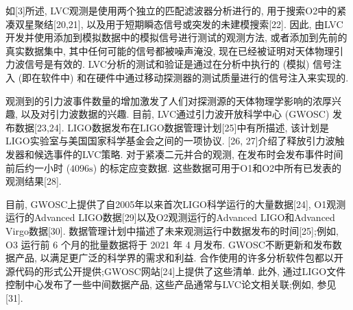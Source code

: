 \documentclass[a4paper]{\documentclassname}
\def\t{\text}
\theoremstyle{definition}
\begin{document}
如[3]所述, LVC观测是使用两个独立的匹配滤波器分析进行的, 用于搜索O2中的紧凑双星聚结[20,21], 以及用于短期瞬态信号或突发的未建模搜索[22]. 因此, 由LVC开发并使用添加到模拟数据中的模拟信号进行测试的观测方法, 或者添加到先前的真实数据集中, 其中任何可能的信号都被噪声淹没, 现在已经被证明对天体物理引力波信号是有效的. LVC分析的测试和验证是通过在分析中执行的 (模拟) 信号注入 (即在软件中) 和在硬件中通过移动探测器的测试质量进行的信号注入来实现的. 

观测到的引力波事件数量的增加激发了人们对探测源的天体物理学影响的浓厚兴趣, 以及对引力波数据的兴趣. 目前, LVC通过引力波开放科学中心 (GWOSC) 发布数据[23,24]. LIGO数据发布在LIGO数据管理计划[25]中有所描述, 该计划是LIGO实验室与美国国家科学基金会之间的一项协议. [26,  27]介绍了释放引力波触发器和候选事件的LVC策略. 对于紧凑二元并合的观测, 在发布时会发布事件时间前后约一小时 ($4096\t{s}$) 的标定应变数据. 这些数据可用于O1和O2中所有已发表的观测结果[28]. 

目前, GWOSC上提供了自2005年以来首次LIGO科学运行的大量数据[24], O1观测运行的Advanced LIGO数据[29]以及O2观测运行的Advanced LIGO和Advanced Virgo数据[30]. 数据管理计划中描述了未来观测运行中数据发布的时间[25];例如, O3 运行前 6 个月的批量数据将于 2021 年 4 月发布. GWOSC不断更新和发布数据产品, 以满足更广泛的科学界的需求和利益. 合作使用的许多分析软件包都以开源代码的形式公开提供;GWOSC网站[24]上提供了这些清单. 此外, 通过LIGO文件控制中心发布了一些中间数据产品, 这些产品通常与LVC论文相关联;例如, 参见[31]. 
\end{document}

